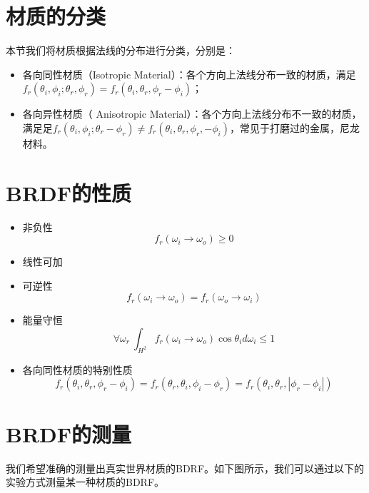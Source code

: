 \documentclass[openany]{progbookcn}
\begin{document}
\section{材质的分类}

本节我们将材质根据法线的分布进行分类，分别是：
\begin{itemize}
	\item 各向同性材质（Isotropic Material）：各个方向上法线分布一致的材质，满足$f_r(\theta_i,\phi_i;\theta_r,\phi_r)=f_r(\theta_i,\theta_r,\phi_r-\phi_i)$；
	\item 各向异性材质（ Anisotropic Material）：各个方向上法线分布不一致的材质，满足足$f_r(\theta_i,\phi_i;\theta_r-\phi_r)\neq f_r(\theta_i,\theta_r,\phi_r,-\phi_i)$，常见于打磨过的金属，尼龙材料。
\end{itemize}

\section{BRDF的性质}
\begin{itemize}
	\item 非负性
	\begin{equation}
		f_r(\omega_i\rightarrow \omega_o) \geq 0
	\end{equation}
	\item 线性可加
	\item 可逆性
	\begin{equation}
		f_r(\omega_i\rightarrow \omega_o)=f_r(\omega_o\rightarrow \omega_i)
	\end{equation}
	\item 能量守恒
	\begin{equation}
		\forall\omega_r\ \int_{H^2}f_r(\omega_i\rightarrow \omega_o)\cos\theta_id\omega_i\leq 1
	\end{equation}
	\item 各向同性材质的特别性质
	\begin{equation}
		f_r(\theta_i,\theta_r,\phi_r-\phi_i)=f_r(\theta_r,\theta_i,\phi_i-\phi_r)=f_r(\theta_i,\theta_r,|\phi_r-\phi_i|)
	\end{equation}
\end{itemize}

\section{BRDF的测量}

我们希望准确的测量出真实世界材质的BDRF。如下图所示，我们可以通过以下的实验方式测量某一种材质的BDRF。
\end{document}
